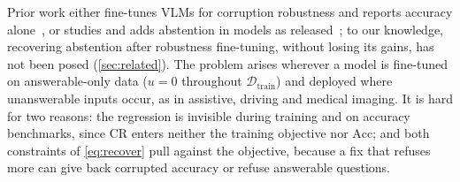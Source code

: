 Prior work either fine-tunes VLMs for corruption robustness and reports accuracy
alone~\cite{he2026videoreasoningmodelsready,tang2026robustr1,liu2026roma}, or studies and adds abstention in models as released~\cite{miyai2024upd,zhu2025mohobench,madhusudhan2026knowing,pramono2026trapsbench,he2026knowing,vardi2025clipup}; to our knowledge, recovering abstention after robustness fine-tuning, without losing its gains, has not been posed (\cref{sec:related}). The problem arises wherever a model is fine-tuned on answerable-only data ($u = 0$ throughout $\mathcal{D}_{\mathrm{train}}$) and deployed where unanswerable inputs occur, as in assistive, driving and medical imaging. It is hard for two reasons: the regression is invisible during training and on accuracy benchmarks, since $\mathrm{CR}$ enters neither the training objective nor $\mathrm{Acc}$; and both constraints of \cref{eq:recover} pull against the objective, because a fix that refuses more can give back corrupted accuracy or
refuse answerable questions.